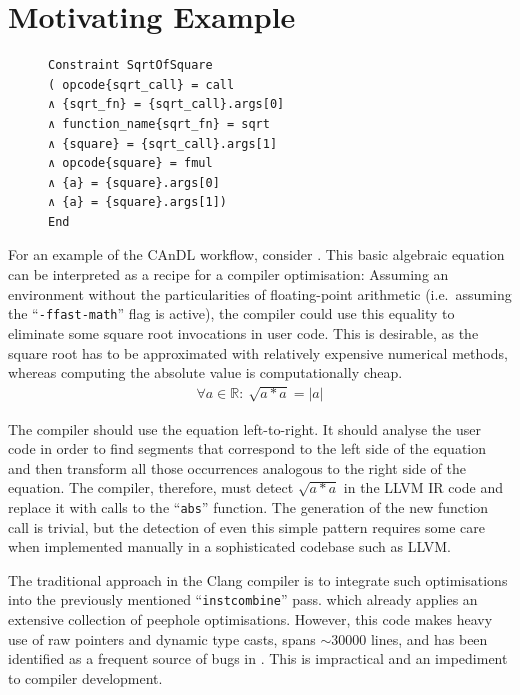\section{Motivating Example}

\begin{figure}[b]
\centering
\vspace{3.6mm}
\begin{minipage}[t]{0.68\textwidth}
\begin{lstlisting}[language=CAnDL,label={fig:candlspec},caption=
   {The left side of \Cref{fig:root} as specified in CAnDL}]
Constraint SqrtOfSquare
( opcode{sqrt_call} = call
∧ {sqrt_fn} = {sqrt_call}.args[0]
∧ function_name{sqrt_fn} = sqrt
∧ {square} = {sqrt_call}.args[1]
∧ opcode{square} = fmul
∧ {a} = {square}.args[0]
∧ {a} = {square}.args[1])
End
\end{lstlisting}
\end{minipage}
\end{figure}

    For an example of the CAnDL workflow, consider .
    This basic algebraic equation can be interpreted as a recipe for a compiler
    optimisation:
    Assuming an environment without the particularities of floating-point
    arithmetic (i.e.\ assuming the ``{\tt-ffast-math}'' flag is active), the
    compiler could use this equality to eliminate some square root invocations
    in user code.
    This is desirable, as the square root has to be approximated with relatively
    expensive numerical methods, whereas computing the absolute value is
    computationally cheap.
    \begin{align}
    \label{fig:root}
    \forall a\in \mathbb{R}\colon\ \sqrt{a*a}=|a|
    \end{align}

    The compiler should use the equation left-to-right.
    It should analyse the user code in order to find segments that correspond to
    the left side of the equation and then transform all those occurrences
    analogous to the right side of the equation.
    The compiler, therefore, must detect $\sqrt{a*a}$ in the LLVM IR code and
    replace it with calls to the ``{\tt abs}'' function.
    The generation of the new function call is trivial, but the detection of
    even this simple pattern requires some care when implemented manually in
    a sophisticated codebase such as LLVM.

    The traditional approach in the Clang compiler is to integrate such
    optimisations into the previously mentioned ``{\tt instcombine}'' pass.
    which already applies an extensive collection of peephole optimisations.
    However, this code makes heavy use of raw pointers and dynamic type casts,
    spans ${\sim}30000$ lines, and has been identified as a frequent source of
    bugs in
    \citet{Menendez:2017:ADP:3062341.3062372,Yang:2011:FUB:1993316.1993532}.
    This is impractical and an impediment to compiler development.

